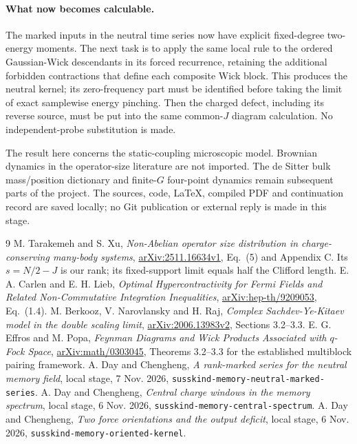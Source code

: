 \documentclass[11pt]{article}
\begin{document}
\paragraph{What now becomes calculable.}
The marked inputs in the neutral time series now have explicit
fixed-degree two-energy moments. The next task is to apply the same
local rule to the ordered Gaussian-Wick descendants in its forced
recurrence, retaining the additional forbidden contractions that
define each composite Wick block. This produces the neutral kernel;
its zero-frequency part must be identified before taking the limit
of exact samplewise energy pinching. Then the charged defect,
including its reverse source, must be put into the same common-$J$
diagram calculation. No independent-probe substitution is made.

The result here concerns the static-coupling microscopic model.
Brownian dynamics in the operator-size literature are not imported.
The de Sitter bulk mass/position dictionary and finite-$G$ four-point
dynamics remain subsequent parts of the project. The sources, code,
LaTeX, compiled PDF and continuation record are saved locally;
no Git publication or external reply is made in this stage.

\newpage
\begin{thebibliography}{9}\small
{} M. Tarakemeh and S. Xu, \emph{Non-Abelian operator size
distribution in charge-conserving many-body systems},
\href{https://arxiv.org/abs/2511.16634}{arXiv:2511.16634v1}, Eq.\ (5)
and Appendix C. Its $s=N/2-J$ is our rank; its fixed-support limit
equals half the Clifford length.
 E. A. Carlen and E. H. Lieb, \emph{Optimal Hypercontractivity
for Fermi Fields and Related Non-Commutative Integration Inequalities},
\href{https://arxiv.org/abs/hep-th/9209053}{arXiv:hep-th/9209053}, Eq.\ (1.4).
 M. Berkooz, V. Narovlansky and H. Raj,
\emph{Complex Sachdev-Ye-Kitaev model in the double scaling limit},
\href{https://arxiv.org/abs/2006.13983}{arXiv:2006.13983v2},
Sections 3.2--3.3.
 E. G. Effros and M. Popa, \emph{Feynman Diagrams and Wick
Products Associated with $q$-Fock Space},
\href{https://arxiv.org/abs/math/0303045}{arXiv:math/0303045},
Theorems 3.2--3.3 for the established multiblock pairing framework.
 A. Day and Chengheng, \emph{A rank-marked series for the
neutral memory field}, local stage, 7 Nov. 2026,
\texttt{susskind-memory-neutral-marked-series}.
 A. Day and Chengheng, \emph{Central charge windows in
the memory spectrum}, local stage, 6 Nov. 2026,
\texttt{susskind-memory-central-spectrum}.
 A. Day and Chengheng, \emph{Two force orientations and
the output deficit}, local stage, 6 Nov. 2026,
\texttt{susskind-memory-oriented-kernel}.
\end{thebibliography}
\end{document}
